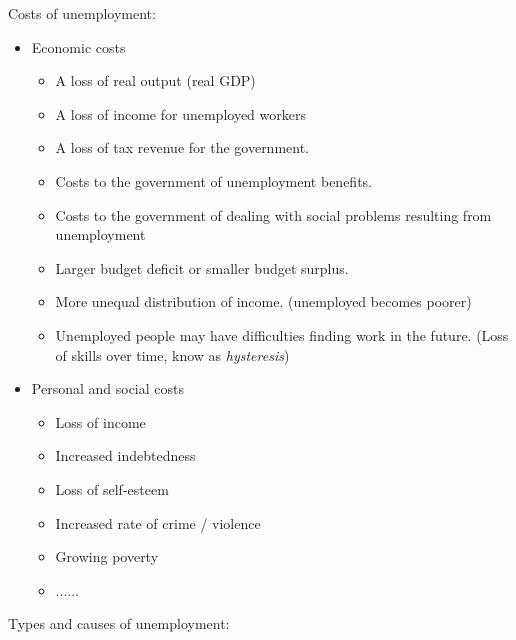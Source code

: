 \documentclass[a4paper,12pt]{article}
\begin{document}
Costs of unemployment:
\begin{itemize}
  \item Economic costs
  \begin{itemize}
    \item A loss of real output (real GDP)
    \item A loss of income for unemployed workers
    \item A loss of tax revenue for the government. 
    \item Costs to the government of unemployment benefits.
    \item Costs to the government of dealing with social problems resulting from unemployment
    \item Larger budget deficit or smaller budget surplus.
    \item More unequal distribution of income. (unemployed becomes poorer)
    \item Unemployed people may have difficulties finding work in the future. (Loss of skills over time, know as \textit{hysteresis})
  \end{itemize}
  \item Personal and social costs
  \begin{itemize}
    \item Loss of income
    \item Increased indebtedness 
    \item Loss of self-esteem
    \item Increased rate of crime / violence
    \item Growing poverty
    \item ......
  \end{itemize}
\end{itemize}
Types and causes of unemployment:
\end{document}

